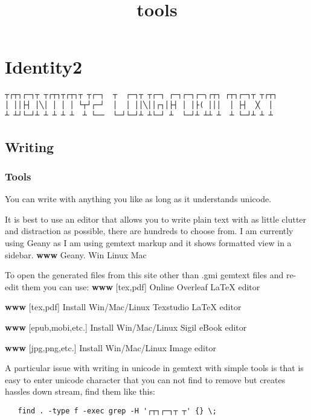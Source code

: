 \documentclass[
]{article}
\title{tools}
\author{}
\date{}
\begin{document}
\maketitle

\section{Identity2}

\begin{verbatim}
┬┌┬┐┌─┐┬ ┬┌┬┐┬┌┬┐┬ ┬┌─┐  ┬  ┌─┐┬ ┬┌─┐ ┌─┐┌─┐┌─╮┌┬┐ ┌┬┐┌─┐┬ ┬┌┬┐
│ ││├┤ │╲│ │ │ │ └┬┘┌─┘  │  │ ││╲││┌┐│├┤ │ │├( │││  │ ├┤  ╳  │
┴ ┴┘└─┘┴ ┴ ┴ ┴ ┴  ┴ └──  └─┘└─┘┴ ┴└─┘ ┴  └─┘┴ ┴┴ ┴  ┴ └─┘┴ ┴ ┴
\end{verbatim}

\subsection{Writing}

\subsubsection{Tools}

You can write with anything you like as long as it understands unicode.

It is best to use an editor that allows you to write plain text with as
little clutter and distraction as possible, there are hundreds to choose
from. I am currently using Geany as I am using gemtext markup and it
shows formatted view in a sidebar. \textbf{www} Geany. Win Linux Mac

To open the generated files from this site other than .gmi gemtext files
and re-edit them you can use: \textbf{www} {[}tex,pdf{]} Online Overleaf
LaTeX editor

\textbf{www} {[}tex,pdf{]} Install Win/Mac/Linux Texstudio LaTeX editor

\textbf{www} {[}epub,mobi,etc.{]} Install Win/Mac/Linux Sigil eBook
editor

\textbf{www} {[}jpg,png,etc.{]} Install Win/Mac/Linux Image editor

A particular issue with writing in unicode in gemtext with simple tools
is that is easy to enter unicode character that you can not find to
remove but creates hassles down stream, find them like this:

\begin{verbatim}
   find . -type f -exec grep -H '┌┬┐┌─┐┬ ┬' {} \;
\end{verbatim}
\end{document}
